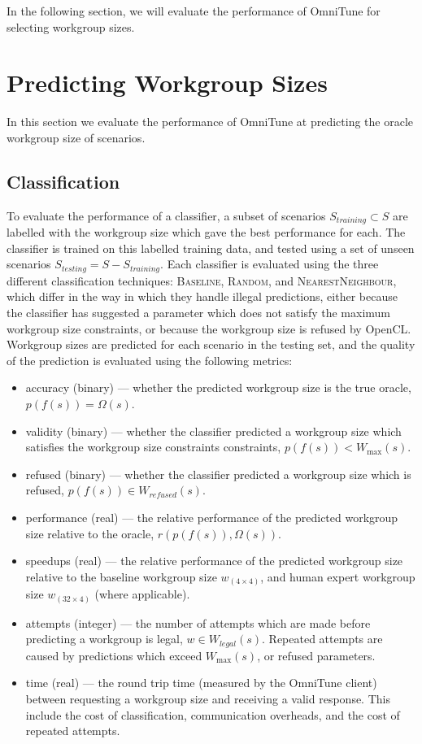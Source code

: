 In the following section, we will evaluate the performance of OmniTune
for selecting workgroup sizes.


\section{Predicting Workgroup Sizes}

In this section we evaluate the performance of OmniTune at predicting
the oracle workgroup size of scenarios.

\subsection{Classification}

To evaluate the performance of a classifier, a subset of scenarios
$S_{training} \subset S$ are labelled with the workgroup size which
gave the best performance for each. The classifier is trained on this
labelled training data, and tested using a set of unseen scenarios
$S_{testing} = S - S_{training}$. Each classifier is evaluated using
the three different classification techniques: \textsc{Baseline},
\textsc{Random}, and \textsc{NearestNeighbour}, which differ in the
way in which they handle illegal predictions, either because the
classifier has suggested a parameter which does not satisfy the
maximum workgroup size constraints, or because the workgroup size is
refused by OpenCL. Workgroup sizes are predicted for each scenario in
the testing set, and the quality of the prediction is evaluated using
the following metrics:

\begin{itemize}
\item accuracy (binary) --- whether the predicted workgroup size is the
  true oracle, $p(f(s)) = \Omega(s)$.
\item validity (binary) --- whether the classifier predicted a workgroup
  size which satisfies the workgroup size constraints constraints,
  $p(f(s)) < W_{\max}(s)$.
\item refused (binary) --- whether the classifier predicted a workgroup
  size which is refused, $p(f(s)) \in W_{refused}(s)$.
\item performance (real) --- the relative performance of the predicted
  workgroup size relative to the oracle, $r(p(f(s)), \Omega(s))$.
\item speedups (real) --- the relative performance of the predicted
  workgroup size relative to the baseline workgroup size
  $w_{(4 \times 4)}$, and human expert workgroup size
  $w_{(32 \times 4)}$ (where applicable).
\item attempts (integer) --- the number of attempts which are made
  before predicting a workgroup is legal, $w \in W_{legal}(s)$.
  Repeated attempts are caused by predictions which exceed
  $W_{\max}(s)$, or refused parameters.
\item time (real) --- the round trip time (measured by the OmniTune
  client) between requesting a workgroup size and receiving a valid
  response. This include the cost of classification, communication
  overheads, and the cost of repeated attempts.
\end{itemize}


